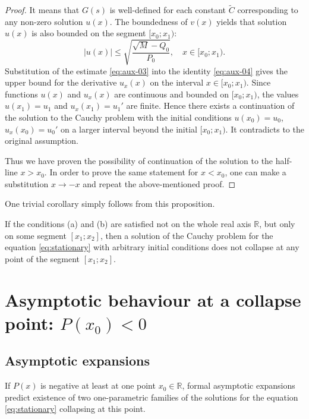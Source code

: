 \begin{proof}
	It means that $G(s)$ is well-defined for each constant $\widetilde{C}$ corresponding to any non-zero solution $u(x)$.
	The boundedness of $v(x)$ yields that solution $u(x)$ is also bounded on the segment $[x_0; x_1)$:
	\begin{equation}
		|u(x)| \le \sqrt{\dfrac{\sqrt{M} - Q_0}{P_0}}, \quad x \in [x_0; x_1).
		\label{eq:aux-03}
	\end{equation}
	Substitution of the estimate \eqref{eq:aux-03} into the identity \eqref{eq:aux-04} gives the upper bound for the derivative $u_{x}(x)$ on the interval $x \in [x_0; x_1)$.
	Since functions $u(x)$ and $u_{x}(x)$ are continuous and bounded on $[x_0; x_1)$, the values $u(x_1) = u_1$ and $u_{x}(x_1) = u_1'$ are finite.
	Hence there exists a continuation of the solution to the Cauchy problem with the initial conditions $u(x_0) = u_0$, $u_{x}(x_0) = u_0'$ on a larger interval beyond the initial $[x_0; x_1)$.
	It contradicts to the original assumption.
	
	Thus we have proven the possibility of continuation of the solution to the half-line $x > x_0$.
	In order to prove the same statement for $x < x_0$, one can make a substitution $x \to -x$ and repeat the above-mentioned proof.
\end{proof}

One trivial corollary simply follows from this proposition.
\begin{corollary}
	If the conditions (a) and (b) are satisfied not on the whole real axis $\mathbb{R}$, but only on some segment $[x_1; x_2]$, then a solution of the Cauchy problem for the equation \eqref{eq:stationary} with arbitrary initial conditions does not collapse at any point of the segment $[x_1; x_2]$.
\end{corollary}

\section{Asymptotic behaviour at a collapse point: $P(x_0) < 0$}

\subsection{Asymptotic expansions}

If $P(x)$ is negative at least at one point $x_0 \in \mathbb{R}$, formal asymptotic expansions predict existence of two one-parametric families of the solutions for the equation \eqref{eq:stationary} collapsing at this point.

